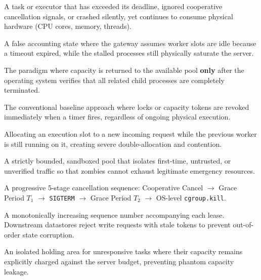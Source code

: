 \documentclass[12pt,a4paper]{report}
\begin{document}
\begin{description}[leftmargin=!,labelwidth=4cm]
    \item[\textbf{Zombie Task:}] A task or executor that has exceeded its deadline, ignored cooperative cancellation signals, or crashed silently, yet continues to consume physical hardware (CPU cores, memory, threads).
    \item[\textbf{Phantom Capacity:}] A false accounting state where the gateway assumes worker slots are idle because a timeout expired, while the stalled processes still physically saturate the server.
    \item[\textbf{Owner-Confirmed Release:}] The paradigm where capacity is returned to the available pool \textbf{only} after the operating system verifies that all related child processes are completely terminated.
    \item[\textbf{Timed Release:}] The conventional baseline approach where locks or capacity tokens are revoked immediately when a timer fires, regardless of ongoing physical execution.
    \item[\textbf{Premature Reuse:}] Allocating an execution slot to a new incoming request while the previous worker is still running on it, creating severe double-allocation and contention.
    \item[\textbf{Sacrificial Pool:}] A strictly bounded, sandboxed pool that isolates first-time, untrusted, or unverified traffic so that zombies cannot exhaust legitimate emergency resources.
    \item[\textbf{Termination Ladder:}] A progressive 5-stage cancellation sequence: Cooperative Cancel $\rightarrow$ Grace Period $T_1$ $\rightarrow$ \texttt{SIGTERM} $\rightarrow$ Grace Period $T_2$ $\rightarrow$ OS-level \texttt{cgroup.kill}.
    \item[\textbf{Fencing Token:}] A monotonically increasing sequence number accompanying each lease. Downstream datastores reject write requests with stale tokens to prevent out-of-order state corruption.
    \item[\textbf{Quarantine:}] An isolated holding area for unresponsive tasks where their capacity remains explicitly charged against the server budget, preventing phantom capacity leakage.
\end{description}

\clearpage

\tableofcontents
\clearpage
\end{document}
